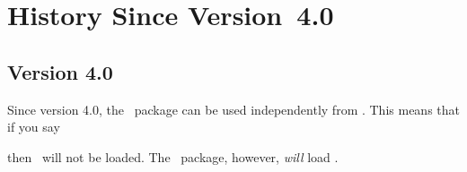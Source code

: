 \documentclass[load-preamble+]{cnltx-doc}
\begin{document}



\appendix
\section{History Since Version~4.0}
\subsection{Version 4.0}
Since version 4.0, the \chemformula\ package can be used
independently from \chemmacros.  This means that if you say
\begin{sourcecode}
  \usepackage{chemformula}
\end{sourcecode}
then \chemmacros\ will not be loaded.  The \chemmacros\ package, however,
\emph{will} load \chemformula.
\end{document}

